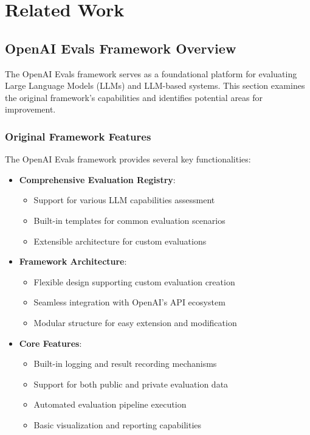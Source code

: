 \section{Related Work}

\subsection{OpenAI Evals Framework Overview}
The OpenAI Evals framework serves as a foundational platform for evaluating Large Language Models (LLMs) and LLM-based systems. This section examines the original framework's capabilities and identifies potential areas for improvement.

\subsubsection{Original Framework Features}
The OpenAI Evals framework provides several key functionalities:
\begin{itemize}
    \item \textbf{Comprehensive Evaluation Registry}:
    \begin{itemize}
        \item Support for various LLM capabilities assessment
        \item Built-in templates for common evaluation scenarios
        \item Extensible architecture for custom evaluations
    \end{itemize}
    
    \item \textbf{Framework Architecture}:
    \begin{itemize}
        \item Flexible design supporting custom evaluation creation
        \item Seamless integration with OpenAI's API ecosystem
        \item Modular structure for easy extension and modification
    \end{itemize}
    
    \item \textbf{Core Features}:
    \begin{itemize}
        \item Built-in logging and result recording mechanisms
        \item Support for both public and private evaluation data
        \item Automated evaluation pipeline execution
        \item Basic visualization and reporting capabilities
    \end{itemize}
\end{itemize}

